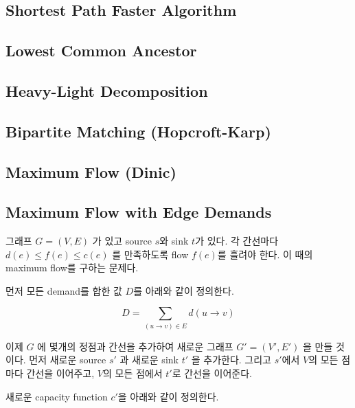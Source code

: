 \documentclass[10pt,landscape,a4paper,twocolumn]{article}
\begin{document}
\subsection{Shortest Path Faster Algorithm}


\subsection{Lowest Common Ancestor}


\subsection{Heavy-Light Decomposition}


\subsection{Bipartite Matching (Hopcroft-Karp)}


\subsection{Maximum Flow (Dinic)}


\subsection{Maximum Flow with Edge Demands}

그래프 $G=(V,E)$ 가 있고 source $s$와 sink $t$가 있다. 각 간선마다 $d(e) \leq f(e) \leq c(e)$ 를 만족하도록 flow $f(e)$를 흘려야 한다. 이 때의 maximum flow를 구하는 문제다.

먼저 모든 demand를 합한 값 $D$를 아래와 같이 정의한다.

\begin{displaymath}
D = \sum_{(u \to v) \in E} d(u \to v)
\end{displaymath}

이제 $G$ 에 몇개의 정점과 간선을 추가하여 새로운 그래프 $G'=(V',E')$ 을 만들 것이다. 먼저 새로운 source $s'$ 과 새로운 sink $t'$ 을 추가한다. 그리고 $s'$에서 $V$의 모든 점마다 간선을 이어주고, $V$의 모든 점에서 $t'$로 간선을 이어준다.

새로운 capacity function $c'$을 아래와 같이 정의한다.
\end{document}
